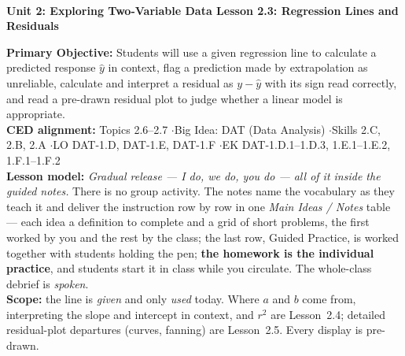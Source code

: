 \documentclass[10pt]{article}
\newcommand{\UnitNumberName}{Unit 2: Exploring Two-Variable Data \quad}
\newcommand{\LessonNumberName}{Lesson 2.3: Regression Lines and Residuals}
\begin{document}
\begin{center}
    {\Large\bfseries \CourseName \\
    {\small\bfseries \UnitNumberName \LessonNumberName}}
\end{center}

\begin{tcolorbox}[colback=sky, colframe=navy, boxrule=0.9pt, arc=2mm,
    left=2mm, right=2mm, top=1.5mm, bottom=1.5mm]
    \textbf{Primary Objective:} Students will use a given regression line to calculate a
    predicted response $\hat{y}$ in context, flag a prediction made by extrapolation as
    unreliable, calculate and interpret a residual as $y - \hat{y}$ with its sign read
    correctly, and read a pre-drawn residual plot to judge whether a linear model is
    appropriate.
    \\[2pt]
    \textbf{CED alignment:} Topics 2.6--2.7 \quad$\cdot$\quad Big Idea: DAT (Data Analysis)
    \quad$\cdot$\quad Skills 2.C, 2.B, 2.A \quad$\cdot$\quad LO DAT-1.D, DAT-1.E, DAT-1.F
    \quad$\cdot$\quad EK DAT-1.D.1--1.D.3, 1.E.1--1.E.2, 1.F.1--1.F.2
    \\[2pt]
    \textbf{Lesson model:} \emph{Gradual release --- I do, we do, you do --- all of it inside
    the guided notes.} There is no group activity. The notes name the vocabulary as they teach
    it and deliver the instruction row by row in one \emph{Main Ideas / Notes} table --- each
    idea a definition to complete and a grid of short problems, the first worked by you and the
    rest by the class; the last row, Guided Practice, is worked together with students holding
    the pen; \textbf{the homework is the individual practice}, and students start it in class
    while you circulate. The whole-class debrief is \emph{spoken}.
    \\[2pt]
    \textbf{Scope:} the line is \emph{given} and only \emph{used} today. Where $a$ and $b$ come
    from, interpreting the slope and intercept in context, and $r^2$ are Lesson~2.4; detailed
    residual-plot departures (curves, fanning) are Lesson~2.5. Every display is pre-drawn.
\end{tcolorbox}
\end{document}
